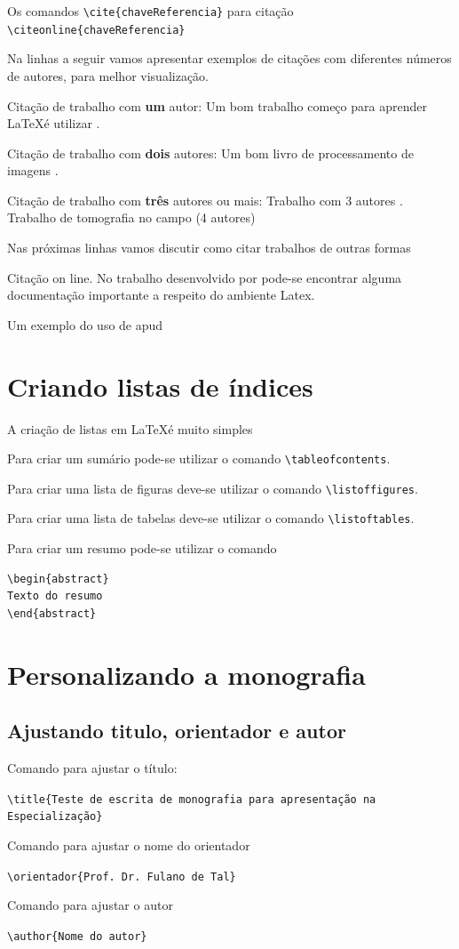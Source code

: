 Os comandos \verb|\cite{chaveReferencia}| para citação \verb|\citeonline{chaveReferencia}|

Na linhas a seguir vamos apresentar exemplos de citações com diferentes números de autores, para melhor visualização.

Citação de trabalho com \textbf{um} autor: Um bom trabalho começo para aprender \LaTeX  é utilizar \cite{Knuth1984}.

Citação  de trabalho com \textbf{dois} autores: Um bom livro de processamento de imagens \cite{Gonzales2000}.

Citação  de trabalho com \textbf{três} autores ou mais: Trabalho com 3 autores \cite{Pereira2001}. Trabalho de tomografia no campo (4 autores) \cite{macedo2002wood}

Nas próximas linhas vamos discutir como citar trabalhos de outras formas

Citação on line. No trabalho desenvolvido por  pode-se encontrar alguma documentação importante a respeito do ambiente Latex. 

Um exemplo do uso de apud 


\section{Criando listas de índices}

A criação de listas em \LaTeX é muito simples 

Para criar um sumário pode-se utilizar o comando \verb|\tableofcontents|.

Para criar uma lista de figuras deve-se utilizar o comando \verb|\listoffigures|.

Para criar uma lista de tabelas deve-se utilizar o comando \verb|\listoftables|.

Para criar um resumo pode-se utilizar o comando 
\begin{verbatim}
\begin{abstract}
Texto do resumo
\end{abstract}
\end{verbatim}

\section{Personalizando a monografia}

\subsection{Ajustando titulo, orientador e autor}

Comando para ajustar o título: 

\noindent
\verb|\title{Teste de escrita de monografia para apresentação na Especialização}|

Comando para ajustar o nome do orientador

\verb|\orientador{Prof. Dr. Fulano de Tal}|

Comando para ajustar o autor

\verb|\author{Nome do autor}|



